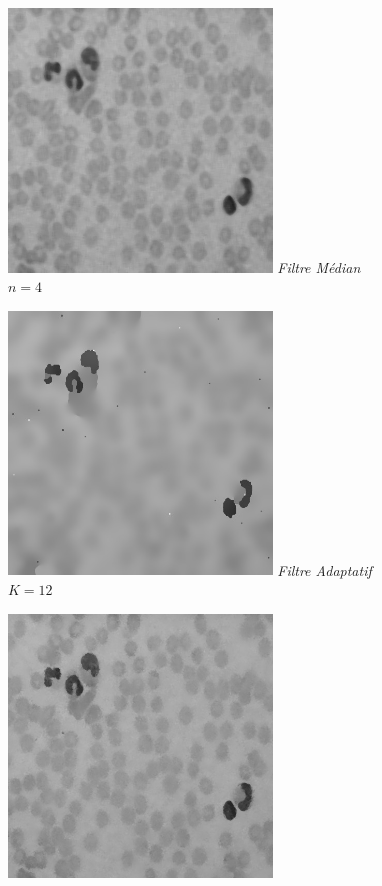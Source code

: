 \documentclass[a4,12pt]{article}
\begin{document}
\noindent
\begin{center}
	\begin{minipage}[c]{0.45\linewidth}
		\begin{center}
			\includegraphics[width = 70mm]{./img/globb25Med4.jpg}
			\textit{Filtre Médian}\\
			\textit{$n=4$}\\
                        \hspace{2em}
		\end{center}
	\end{minipage}
	\begin{minipage}[c]{0.45\linewidth}
		\begin{center}
			\includegraphics[width = 70mm]{./img/globAdapt12.jpg}
			\textit{Filtre Adaptatif}\\
			\textit{$K = 12$}\\
                        \hspace{2em}
		\end{center}
	\end{minipage}
	\begin{minipage}[c]{0.45\linewidth}
		\begin{center}
			\includegraphics[width = 70mm]{./img/globb25Bilateral_5_20.jpg}

\end{center}
\end{minipage}
\end{center}
\end{document}
